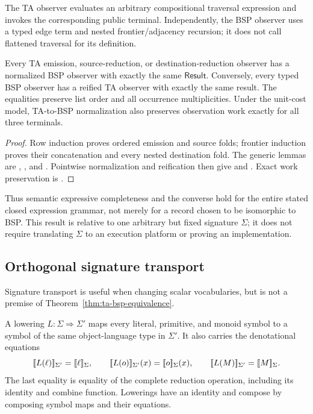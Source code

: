 The TA observer evaluates an arbitrary compositional traversal expression and
invokes the corresponding public terminal.  Independently, the BSP observer
uses a typed edge term and nested frontier/adjacency recursion; it does not
call flattened traversal for its definition.

\begin{theorem}
\label{thm:terminal-observation}
Every TA emission, source-reduction, or destination-reduction observer has a
normalized BSP observer with exactly the same $\mathsf{Result}$.  Conversely,
every typed BSP observer has a reified TA observer with exactly the same
result.  The equalities preserve list order and all occurrence multiplicities.
Under the unit-cost model, TA-to-BSP normalization also preserves observation
work exactly for all three terminals.
\end{theorem}

\begin{proof}
Row induction proves ordered emission and source folds; frontier induction
proves their concatenation and every nested destination fold.  The generic
lemmas are , , and
.  Pointwise normalization and reification then
give  and
.  Exact work preservation is
.
\end{proof}

Thus semantic expressive completeness and the converse hold for the entire
stated closed expression grammar, not merely for a record chosen to be
isomorphic to BSP.  This result is relative to one arbitrary but fixed
signature $\Sigma$; it does not require translating $\Sigma$ to an execution
platform or proving an implementation.

\subsection{Orthogonal signature transport}

Signature transport is useful when changing scalar vocabularies, but is not a
premise of Theorem~\ref{thm:ta-bsp-equivalence}.

\begin{definition}
A lowering $L:\Sigma\Rightarrow\Sigma'$ maps every literal, primitive, and
monoid symbol to a symbol of the same object-language type in $\Sigma'$.  It
also carries the denotational equations
\[
 \denote{L(\ell)}_{\Sigma'}=
   \denote{\ell}_\Sigma,
 \qquad
 \denote{L(o)}_{\Sigma'}(x)=
   \denote{o}_\Sigma(x),
 \qquad
 \denote{L(M)}_{\Sigma'}=
   \denote{M}_\Sigma.
\]
The last equality is equality of the complete reduction operation, including
its identity and combine function.  Lowerings have an identity and compose by
composing symbol maps and their equations.
\end{definition}

